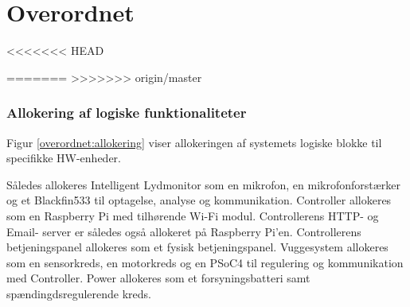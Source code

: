 \chapter{Overordnet}




%
%


<<<<<<< HEAD

=======
>>>>>>> origin/master


\subsection{Allokering af logiske funktionaliteter}
Figur \ref{overordnet:allokering} viser allokeringen af systemets logiske blokke til specifikke HW-enheder.

Således allokeres Intelligent Lydmonitor som en mikrofon, en mikrofonforstærker og et Blackfin533 til optagelse, analyse og kommunikation.
Controller allokeres som en Raspberry Pi med tilhørende Wi-Fi modul. Controllerens HTTP- og Email- server er således også allokeret på Raspberry Pi'en. Controllerens betjeningspanel allokeres som et fysisk betjeningspanel.
Vuggesystem allokeres som en sensorkreds, en motorkreds og en PSoC4 til regulering og kommunikation med Controller.
Power allokeres som et forsyningsbatteri samt spændingdsregulerende kreds.


